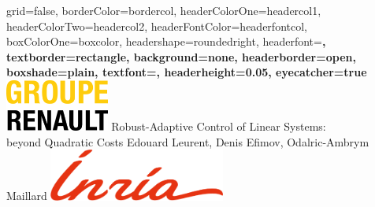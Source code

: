\documentclass[paperwidth=36in,paperheight=48in,portrait,fontscale=0.355, margin=2cm]{baposter}
\begin{document}
\begin{poster}{
grid=false,
borderColor=bordercol, %
headerColorOne=headercol1, %
headerColorTwo=headercol2, %
headerFontColor=headerfontcol, %
boxColorOne=boxcolor, %
headershape=roundedright, %
headerfont=\Large\bf\textsc, %
textborder=rectangle,
background=none,
headerborder=open, %
boxshade=plain,
textfont={\setlength{\parindent}{0.0em}\sffamily},
headerheight={0.05\textheight},
eyecatcher=true
}
%
%
{
\includegraphics[height=1.7cm]{./img/companies}
}
{
Robust-Adaptive Control of Linear Systems:\\beyond Quadratic Costs
}
{
Edouard Leurent, Denis Efimov, Odalric-Ambrym Maillard
\vspace{-3\baselineskip}
}
{
\includegraphics[height=1.7cm]{./img/inria}
}

\setlength{\colheight}{0.92\textheight}


\end{poster}
\end{document}
